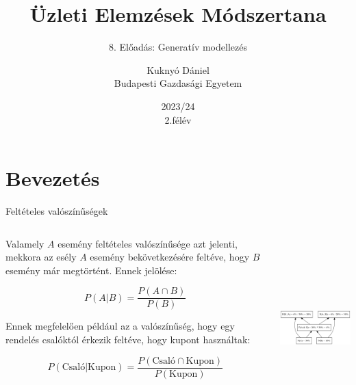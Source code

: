 \documentclass[english, aspectratio=169]{beamer}
\makeatletter
\newcommand\makebeamertitle{\frame{\maketitle}}
\let\origtableofcontents=\tableofcontents
\def\tableofcontents{\@ifnextchar[{\origtableofcontents}{\gobbletableofcontents}}
\def\gobbletableofcontents#1{\origtableofcontents}
\makeatother
\begin{document}
\section{Bevezetés}
\title[]{Üzleti Elemzések Módszertana}
\subtitle{8. Előadás: Generatív modellezés}
\author[Kuknyó Dániel]{Kuknyó Dániel\\Budapesti Gazdasági Egyetem}
\date{2023/24\\2.félév}
\makebeamertitle

\begin{frame}
\tableofcontents{}
\end{frame}

\begin{frame}
\tableofcontents[currentsection]
\end{frame}

\begin{frame}{Feltételes valószínűségek}
\begin{columns}
\begin{column}{.5\textwidth}
Valamely $A$ esemény feltételes valószínűsége azt jelenti, mekkora az esély $A$ esemény bekövetkezésére feltéve, hogy $B$ esemény már megtörtént. Ennek jelölése:
\begin{block}{}
\[
P\left( A \vert B \right) = \frac{P\left( A \cap B \right)}{P\left( B \right)}
\]
\end{block}
Ennek megfelelően például az a valószínűség, hogy egy rendelés csalóktól érkezik feltéve, hogy kupont használtak: 
\begin{block}{}
\vspace{-.4cm}
\[
P\left( \text{Csaló} \vert	\text{Kupon} \right) = \frac{P\left( \text{Csaló} \cap \text{Kupon} \right)}{P\left( \text{Kupon} \right)}
\]
\end{block}
\end{column}
\begin{column}{.5\textwidth}
\begin{center}
\includegraphics[width=7cm, height=7cm, keepaspectratio]{graphs/generative_1.png}
\end{center}
\end{column}
\end{columns}
\end{frame}
\end{document}
